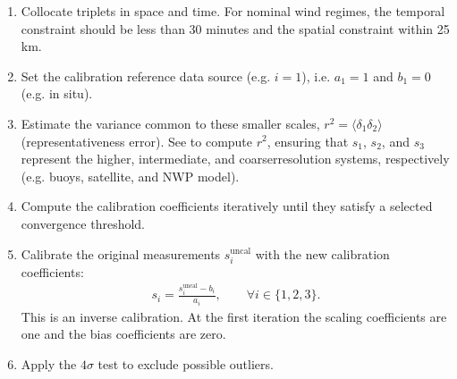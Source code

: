\documentclass[a4paper,10pt,english]{sphinxmanual}
\begin{document}
\begin{enumerate}
%
\item {} 
\sphinxAtStartPar
Collocate triplets in space and time. For nominal wind regimes, the temporal
constraint should be less than 30 minutes and the spatial constraint within
25 km.

\item {} 
\sphinxAtStartPar
Set the calibration reference data source (e.g. \(i=1\)), i.e.
\(a_1=1\) and \(b_1=0\) (e.g. in situ).

\item {} 
\sphinxAtStartPar
Estimate the variance common to these smaller scales,
\(r^2=\langle\delta_1\delta_2\rangle\) (representativeness error). See
{\hyperref[\detokenize{alg-02-validation:spatial-variance}]{}} to compute \(r^2\), ensuring that \(s_1\),
\(s_2\), and \(s_3\) represent the higher\sphinxhyphen{}, intermediate\sphinxhyphen{}, and
coarser\sphinxhyphen{}resolution systems, respectively (e.g. buoys, satellite, and NWP
model).

\item {} 
\sphinxAtStartPar
Compute the calibration coefficients iteratively until they satisfy a
selected convergence threshold.

\item {} 
\sphinxAtStartPar
Calibrate the original measurements \(s_i^{\mathrm{uncal}}\) with the
new calibration coefficients:
\begin{equation*}
\begin{split}s_i=\frac{s_i^{\mathrm{uncal}}-b_i}{a_i},
\qquad \forall i\in\{1,2,3\} .\end{split}
\end{equation*}
\sphinxAtStartPar
This is an inverse calibration. At the first iteration the scaling
coefficients are one and the bias coefficients are zero.

\item {} 
\sphinxAtStartPar
Apply the \(4\sigma\) test to exclude possible outliers.


\end{enumerate}
\end{document}
